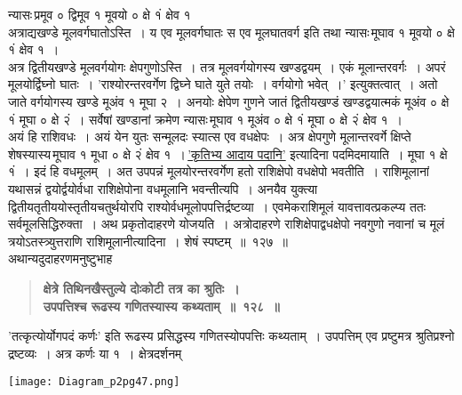 \documentclass[11pt, openany]{book}
\begin{document}
\begin{sloppypar}
न्यासः\textendash \,प्रमूव ० द्विमूव १ मूवयो ० क्षे १ं क्षेव १\\

अत्राद्यखण्डे मूलवर्गघातोऽस्ति~। य एव मूलवर्गघातः स एव मूलघातवर्ग इति तथा न्यासः\textendash \,मूघाव १ मूवयो ० क्षे १ं क्षेव १~।\\

अत्र द्वितीयखण्डे मूलवर्गयोगः क्षेपगुणोऽस्ति~। तत्र मूलवर्गयोगस्य खण्डद्वयम्~। एकं मूलान्तरवर्गः~। अपरं मूलयोर्द्विघ्नो घातः~। {\color{violet}'राश्योरन्तरवर्गेण द्विघ्ने घाते युते तयोः~। वर्गयोगो भवेत्~।'} इत्युक्तत्वात्~। अतो जाते वर्गयोगस्य खण्डे मूअंव १ मूघा २~। अनयोः क्षेपेण गुणने जातं द्वितीयखण्डं खण्डद्वयात्मकं मूअंव ० क्षे १ं मूघा ० क्षे २ं~। सर्वेषां खण्डानां क्रमेण न्यासः\textendash \,मूघाव १ मूअंव ० क्षे १ं मूघा ० क्षे २ं क्षेव १~।\\

अयं हि राशिवधः~। अयं येन युतः सन्मूलदः स्यात्स एव वधक्षेपः~। अत्र क्षेपगुणे मूलान्तरवर्गे क्षिप्ते शेषस्यास्य\textendash \,मूघाव १ मूधा ० क्षे २ं क्षेव १~।\textendash \,\hyperref[3.31]{'कृतिभ्य आदाय पदानि'} इत्यादिना पदमिदमायाति~। मूघा १ क्षे १ं~। इदं हि वधमूलम्~। अत उपपन्नं मूलयोरन्तरवर्गेण हतो राशिक्षेपो वधक्षेपो भवतीति~। राशिमूलानां यथासन्नं द्वयोर्द्वयोर्वधा राशिक्षेपोना वधमूलानि भवन्तीत्यपि~। अनयैव युक्त्या द्वितीयतृतीययोस्तृतीयचतुर्थयोरपि राश्योर्वधमूलोपपत्तिर्द्रष्टव्या~। एवमेकराशिमूलं यावत्तावत्प्रकल्प्य ततः सर्वमूलसिद्धिरुक्ता~। अथ प्रकृतोदाहरणे योजयति~। अत्रोदाहरणे राशिक्षेपाद्वधक्षेपो नवगुणो नवानां च मूलं त्रयोऽतस्त्र्युत्तराणि राशिमूलानीत्यादिना~। शेषं स्पष्टम्~॥~१२७~॥\\

{\small अथान्यदुदाहरणमनुष्टुभाह\textendash }

 \label{8.128}
\begin{quote}
{\large \textbf{{\color{purple}क्षेत्रे तिथिनखैस्तुल्ये दोःकोटी तत्र का श्रुतिः~।\\
उपपत्तिश्च रूढस्य गणितस्यास्य कथ्यताम्~॥~१२८~॥}}}
\end{quote}

{\color{violet}'तत्कृत्योर्योगपदं कर्णः'} इति रूढस्य प्रसिद्धस्य गणितस्योपपत्तिः कथ्यताम्~। उपपत्तिम् एव प्रष्टुमत्र श्रुतिप्रश्नो द्रष्टव्यः~। अत्र कर्णः या १~। क्षेत्रदर्शनम्

\begin{center}
\texttt{[image: Diagram\_p2pg47.png]}
\end{center}
\end{sloppypar}
\end{document}
